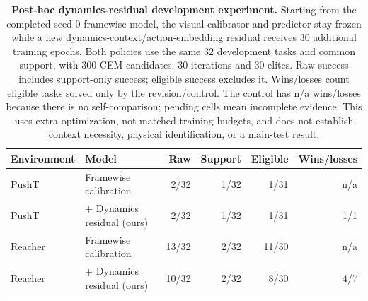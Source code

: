 \begin{table}[H]\centering\small
\begin{tabular}{llrrrr}\toprule
Environment & Model & Raw & Support & Eligible & Wins/losses \\\midrule
PushT & Framewise calibration & 2/32 & 1/32 & 1/31 & n/a \\
PushT & + Dynamics residual (ours) & 2/32 & 1/32 & 1/31 & 1/1 \\
Reacher & Framewise calibration & 13/32 & 2/32 & 11/30 & n/a \\
Reacher & + Dynamics residual (ours) & 10/32 & 2/32 & 8/30 & 4/7 \\
\bottomrule\end{tabular}
\caption{\textbf{Post-hoc dynamics-residual development experiment.} Starting from the completed seed-0 framewise model, the visual calibrator and predictor stay frozen while a new dynamics-context/action-embedding residual receives 30 additional training epochs. Both policies use the same 32 development tasks and common support, with 300 CEM candidates, 30 iterations and 30 elites. Raw success includes support-only success; eligible success excludes it. Wins/losses count eligible tasks solved only by the revision/control. The control has n/a wins/losses because there is no self-comparison; pending cells mean incomplete evidence. This uses extra optimization, not matched training budgets, and does not establish context necessity, physical identification, or a main-test result.}
\label{tab:dynamics-revision}\end{table}
